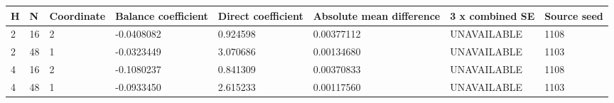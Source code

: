 \begin{tabular}{llllllll}
H & N & Coordinate & Balance coefficient & Direct coefficient & Absolute mean difference & 3 x combined SE & Source seed \\
\hline
2 & 16 & 2 & -0.0408082 & 0.924598 & 0.00377112 & UNAVAILABLE & 1108 \\
2 & 48 & 1 & -0.0323449 & 3.070686 & 0.00134680 & UNAVAILABLE & 1103 \\
4 & 16 & 2 & -0.1080237 & 0.841309 & 0.00370833 & UNAVAILABLE & 1108 \\
4 & 48 & 1 & -0.0933450 & 2.615233 & 0.00117560 & UNAVAILABLE & 1103 \\
\end{tabular}
